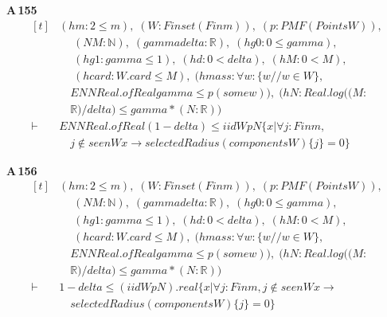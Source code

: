 \noindent\textbf{A\,155}\quad{}
{\footnotesize\[ \begin{aligned}[t]
&(\mathit{hm} : 2 \leq \mathit{m}),\; (\mathit{W} : \mathit{Finset} (\mathit{Fin} \mathit{m})),\; (\mathit{p} : \mathit{PMF} (\mathit{Points} \mathit{W})),\\
&\quad \; (\mathit{N} \mathit{M} : \mathbb{N} ),\; (\mathit{gamma} \mathit{delta} : \mathbb{R} ),\; (\mathit{hg0} : 0 \leq \mathit{gamma}),\\
&\quad \; (\mathit{hg1} : \mathit{gamma} \leq 1),\; (\mathit{hd} : 0 < \mathit{delta}),\; (\mathit{hM} : 0 < \mathit{M}),\\
&\quad \; (\mathit{hcard} : \mathit{W}.\mathit{card} \leq \mathit{M}),\; (\mathit{hmass} : \forall \mathit{w} : \{ \mathit{w} // \mathit{w} \in \mathit{W}\} ,\\
&\quad \mathit{ENNReal}.\mathit{ofReal} \mathit{gamma} \leq \mathit{p} (\mathit{some} \mathit{w})),\; (\mathit{hN} : \mathit{Real}.\mathit{log} ((\mathit{M}:\\
&\quad \mathbb{R} )/\mathit{delta}) \leq \mathit{gamma}*(\mathit{N}:\mathbb{R} ))\\
\vdash\;&\mathit{ENNReal}.\mathit{ofReal} (1-\mathit{delta}) \leq \mathit{iid} \mathit{W} \mathit{p} \mathit{N} \{ \mathit{x} | \forall \mathit{j} : \mathit{Fin} \mathit{m},\\
&\quad \mathit{j} \notin \mathit{seen} \mathit{W} \mathit{x} \to \mathit{selectedRadius} (\mathit{components} \mathit{W}) \{ \mathit{j}\} = 0\}
\end{aligned} \]}

\noindent\textbf{A\,156}\quad{}
{\footnotesize\[ \begin{aligned}[t]
&(\mathit{hm} : 2 \leq \mathit{m}),\; (\mathit{W} : \mathit{Finset} (\mathit{Fin} \mathit{m})),\; (\mathit{p} : \mathit{PMF} (\mathit{Points} \mathit{W})),\\
&\quad \; (\mathit{N} \mathit{M} : \mathbb{N} ),\; (\mathit{gamma} \mathit{delta} : \mathbb{R} ),\; (\mathit{hg0} : 0 \leq \mathit{gamma}),\\
&\quad \; (\mathit{hg1} : \mathit{gamma} \leq 1),\; (\mathit{hd} : 0 < \mathit{delta}),\; (\mathit{hM} : 0 < \mathit{M}),\\
&\quad \; (\mathit{hcard} : \mathit{W}.\mathit{card} \leq \mathit{M}),\; (\mathit{hmass} : \forall \mathit{w} : \{ \mathit{w} // \mathit{w} \in \mathit{W}\} ,\\
&\quad \mathit{ENNReal}.\mathit{ofReal} \mathit{gamma} \leq \mathit{p} (\mathit{some} \mathit{w})),\; (\mathit{hN} : \mathit{Real}.\mathit{log} ((\mathit{M}:\\
&\quad \mathbb{R} )/\mathit{delta}) \leq \mathit{gamma}*(\mathit{N}:\mathbb{R} ))\\
\vdash\;&1 - \mathit{delta} \leq (\mathit{iid} \mathit{W} \mathit{p} \mathit{N}).\mathit{real} \{ \mathit{x} | \forall \mathit{j} : \mathit{Fin} \mathit{m}, \mathit{j} \notin \mathit{seen} \mathit{W} \mathit{x} \to\\
&\quad \mathit{selectedRadius} (\mathit{components} \mathit{W}) \{ \mathit{j}\} = 0\}
\end{aligned} \]}

